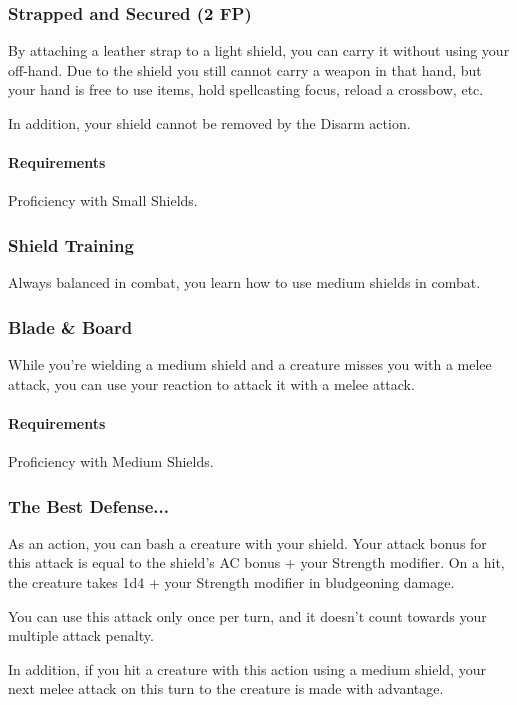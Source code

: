 \subsubsection{Strapped and Secured (2 FP)} \label{feat::strappedandsecured}
    By attaching a leather strap to a light shield, you can carry it without using your off-hand.
    Due to the shield you still cannot carry a weapon in that hand, but your hand is free to use items, hold spellcasting focus, reload a crossbow, etc.

    In addition, your shield cannot be removed by the Disarm action.
    \paragraph{Requirements} Proficiency with Small Shields.
\subsubsection{Shield Training} \label{feat::shieldtraining}
    Always balanced in combat, you learn how to use medium shields in combat.
\subsubsection{Blade \& Board} \label{feat::bladeandboard}
    While you're wielding a medium shield and a creature misses you with a melee attack, you can use your reaction to attack it with a melee attack.
    \paragraph{Requirements} Proficiency with Medium Shields.
\subsubsection{The Best Defense...} \label{feat::thebestdefense}
    As an action, you can bash a creature with your shield.
    Your attack bonus for this attack is equal to the shield's AC bonus + your Strength modifier.
    On a hit, the creature takes 1d4 + your Strength modifier in bludgeoning damage.

    You can use this attack only once per turn, and it doesn't count towards your multiple attack penalty.

    In addition, if you hit a creature with this action using a medium shield, your next melee attack on this turn to the creature is made with advantage.
